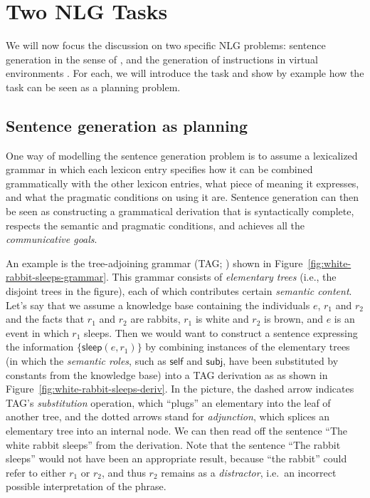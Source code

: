 \section{Two NLG Tasks}
\label{sec:domains}

We will now focus the discussion on two specific NLG problems:
sentence generation in the sense of \citet{KolSto07}, and the
generation of instructions in virtual environments
\citep{ByrKolStrCasDalMooObe09}. For each, we will introduce the task
and show by example how the task can be seen as a planning problem.


\subsection{Sentence generation as planning}
\label{sec:domain-crisp}

One way of modelling the sentence generation problem is to assume a
lexicalized grammar in which each lexicon entry specifies how it can
be combined grammatically with the other lexicon entries, what piece
of meaning it expresses, and what the pragmatic conditions on using it
are. Sentence generation can then be seen as constructing a
grammatical derivation that is syntactically complete, respects the
semantic and pragmatic conditions, and achieves all the
\emph{communicative goals}.

An example is the tree-adjoining grammar (TAG;
\citealt{joshi;etal1997}) shown in
Figure~\ref{fig:white-rabbit-sleeps-grammar}. This grammar consists of
\emph{elementary trees} (i.e., the disjoint trees in the figure), each
of which contributes certain \emph{semantic content}. Let's say that
we assume a knowledge base containing the individuals $e$, $r_1$ and
$r_2$ and the facts that $r_1$ and $r_2$ are rabbits, $r_1$ is white
and $r_2$ is brown, and $e$ is an event in which $r_1$ sleeps. Then we
would want to construct a sentence expressing the information
$\{\mathsf{sleep}(e,r_1)\}$ by combining instances of the elementary
trees (in which the \emph{semantic roles}, such as $\mathsf{self}$ and
$\mathsf{subj}$, have been substituted by constants from the knowledge
base) into a TAG derivation as as shown in
Figure~\ref{fig:white-rabbit-sleeps-deriv}. In the picture, the dashed
arrow indicates TAG's \emph{substitution} operation, which ``plugs''
an elementary into the leaf of another tree, and the dotted arrows
stand for \emph{adjunction}, which splices an elementary tree into an
internal node. We can then read off the sentence ``The white rabbit
sleeps'' from the derivation. Note that the sentence ``The rabbit
sleeps'' would not have been an appropriate result, because ``the
rabbit'' could refer to either $r_1$ or $r_2$, and thus $r_2$ remains
as a \emph{distractor}, i.e.\ an incorrect possible interpretation of
the phrase.

